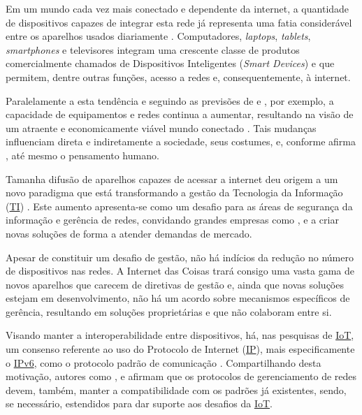\documentclass[twoside,english,brazilian]{UNISINOSmonografia}
\begin{document}
	Em um mundo cada vez mais conectado e dependente da internet, a quantidade 
	de dispositivos capazes de integrar esta rede já representa uma fatia 
	considerável entre os aparelhos usados diariamente \cite{Accenture2012}.
	Computadores, \textit{laptops}, \textit{tablets}, \textit{smartphones} e 
	televisores integram uma crescente classe de produtos comercialmente 
	chamados de Dispositivos Inteligentes (\textit{Smart Devices}) e que 
	permitem, dentre outras funções, acesso a redes e, consequentemente, à 
	internet.
	
	Paralelamente a esta tendência e seguindo as previsões de 
	 e , por exemplo, a capacidade 
	de equipamentos e redes continua a aumentar, resultando na visão de um 
	atraente e economicamente viável mundo conectado \cite{Ding2009}.
	Tais mudanças influenciam direta e indiretamente a sociedade, seus 
	costumes, e, conforme afirma , até mesmo o pensamento 
	humano.
	
	Tamanha difusão de aparelhos capazes de acessar a internet deu origem a um novo 
	paradigma que está transformando a gestão da Tecnologia da Informação (\hyperref[siglas]{TI}) 
	\cite{ZdnetBYOD}.
	Este aumento apresenta-se como um desafio para as áreas de segurança da 
	informação e gerência de redes, convidando grandes empresas como 
	,  e  a 
	criar novas soluções de forma a atender demandas de mercado.
	
	Apesar de constituir um desafio de gestão, não há indícios da redução 
	no número de dispositivos nas redes. 
	A Internet das Coisas trará consigo uma vasta gama 
	de novos aparelhos que carecem de diretivas de gestão \cite{Atzori2010b} 
	e, ainda que novas soluções estejam em desenvolvimento, não há um acordo 
	sobre mecanismos específicos de gerência, resultando em soluções 
	proprietárias e que não colaboram entre si.
	
	Visando manter a interoperabilidade entre dispositivos, há, nas pesquisas 
	de \hyperref[siglas]{IoT}, um consenso referente ao uso do 
	Protocolo de Internet (\hyperref[siglas]{IP}), mais 
	especificamente o \hyperref[siglas]{IPv6}, como o protocolo padrão de comunicação 
	\cite{Dunkels2008,Mattern2010a,Feng2011,Paventhan2012}.
	Compartilhando desta motivação, autores como , 
	 e 
	afirmam que os protocolos de gerenciamento de redes devem, também, manter 
	a compatibilidade com os padrões já existentes, sendo, se necessário, 
	estendidos para dar suporte aos desafios da \hyperref[siglas]{IoT}.
	
\end{document}
